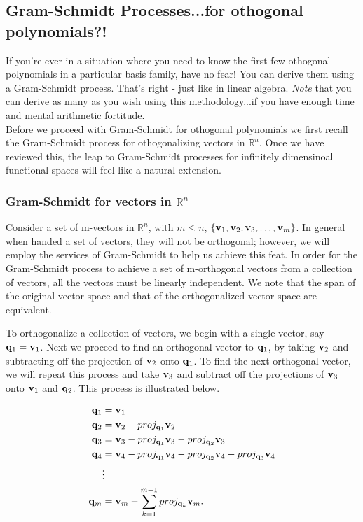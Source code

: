 \subsection{Gram-Schmidt Processes...for othogonal polynomials?!}

If you're ever in a situation where you need to know the first few othogonal polynomials in a particular basis family, have no fear! You can derive them using a Gram-Schmidt process. That's right - just like in linear algebra. \emph{Note} that you can derive as many as you wish using this methodology...if you have enough time and mental arithmetic fortitude. \\

Before we proceed with Gram-Schmidt for othogonal polynomials we first recall the Gram-Schmidt process for othogonalizing vectors in $\mathbb{R}^n$. Once we have reviewed this, the leap to Gram-Schmidt processes for infinitely dimensinoal functional spaces will feel like a natural extension.


%
%
%
%
\subsubsection{Gram-Schmidt for vectors in $\mathbb{R}^n$}

Consider a set of m-vectors in $\mathbb{R}^n$, with $m\leq n$, $\{ {\bf{v}}_1, {\bf{v}}_2, {\bf{v}}_3, \ldots, {\bf{v}}_m\}$. In general when handed a set of vectors, they will not be orthogonal; however, we will employ the services of Gram-Schmidt to help us achieve this feat. In order for the Gram-Schmidt process to achieve a set of m-orthogonal vectors from a collection of vectors, all the vectors must be linearly independent. We note that the span of the original vector space and that of the orthogonalized vector space are equivalent. 

To orthogonalize a collection of vectors, we begin with a single vector, say ${\bf{q}}_1={\bf{v}}_1$. Next we proceed to find an orthogonal vector to ${\bf{q}}_1$, by taking ${\bf{v}}_2$ and subtracting off the projection of ${\bf{v}}_2$ onto ${\bf{q}}_1$. To find the next orthogonal vector, we will repeat this process and take ${\bf{v}}_3$ and subtract off the projections of ${\bf{v}}_3$ onto ${\bf{v}}_1$ and ${\bf{q}}_2$. This process is illustrated below.

\begin{align*}
{\bf{q}}_1 &= {\bf{v}}_1 \\ 
{\bf{q}}_2 &= {\bf{v}}_2 - proj_{ {\bf{q}}_1 } {\bf{v}}_2 \\
{\bf{q}}_3 &= {\bf{v}}_3 - proj_{ {\bf{q}}_1 } {\bf{v}}_3  - proj_{ {\bf{q}}_2} {\bf{v}}_3\\ 
{\bf{q}}_4 &= {\bf{v}}_4 - proj_{ {\bf{q}}_1 } {\bf{v}}_4  - proj_{ {\bf{q}}_2} {\bf{v}}_4 - proj_{ {\bf{q}}_3} {\bf{v}}_4 \\ 
& \vdots  \\ 
{\bf{q}}_m &=  {\bf{v}}_m - \sum_{k=1}^{m-1} proj_{ {\bf{q}}_k }   {\bf{v}}_m.
\end{align*}

